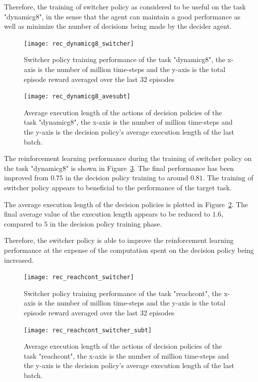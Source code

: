 Therefore, the training of switcher policy as considered to be useful on the task "dynamicg8", in the sense that the agent can maintain a good performance as well as minimize the number of decisions being made by the decider agent. 
\begin{figure}[!htbp]
	\centering
	\texttt{[image: rec\_dynamicg8\_switcher]}
	\caption{Switcher policy training performance of the task "dynamicg8", the x-axis is the number of million time-steps and the y-axis is the total episode reward averaged over the last 32 episodes}
	\label{fig:rec_dynamicg8_switcher}
\end{figure}

\begin{figure}[!htbp]
	\centering
	\texttt{[image: rec\_dynamicg8\_avesubt]}
	\caption{Average execution length of the actions of decision policies of the task "dynamicg8", the x-axis is the number of million time-steps and the y-axis is the decision policy's average execution length of the last batch.}
	\label{fig:rec_dynamicg8_avesubt}
\end{figure}

The reinforcement learning performance during the training of switcher policy on the task "dynamicg8" is shown in Figure~\ref{fig:rec_reachcont_switcher}. The final performance has been improved from $0.75$ in the decision policy training to around $0.81$. The training of switcher policy appears to beneficial to the performance of the target task.

The average execution length of the decision policies is plotted in Figure~\ref{fig:rec_dynamicg8_avesubt}. The final average value of the execution length appears to be reduced to $1.6$, compared to $5$ in the decision policy training phase.

Therefore, the switcher policy is able to improve the reinforcement learning performance at the expense of the computation spent on the decision policy being increased.

\begin{figure}[!htbp]
	\centering
	\texttt{[image: rec\_reachcont\_switcher]}
	\caption{Switcher policy training performance of the task "reachcont", the x-axis is the number of million time-steps and the y-axis is the total episode reward averaged over the last 32 episodes}
	\label{fig:rec_reachcont_switcher}
\end{figure}

\begin{figure}[!htbp]
	\centering
	\texttt{[image: rec\_reachcont\_switcher\_subt]}
	\caption{Average execution length of the actions of decision policies of the task "reachcont", the x-axis is the number of million time-steps and the y-axis is the decision policy's average execution length of the last batch.}
	\label{fig:rec_reachcont_switcher_subt}
\end{figure}